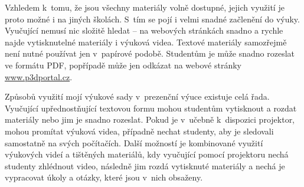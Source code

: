 Vzhledem k~tomu, že jsou všechny materiály volně dostupné, jejich využití je proto možné i na jiných školách.
S~tím se pojí i velmi snadné začlenění do výuky.
Vyučující nemusí nic složitě hledat -- na webových stránkách snadno a rychle najde vytisknutelné materiály i výuková videa.
Textové materiály samozřejmě není nutné používat jen v~papírové podobě. Studentům je může snadno rozeslat ve formátu PDF, popřípadě může jen odkázat na webové stránky \href{https://www.p3dportal.cz}{www.p3dportal.cz}.

Způsobů využití mojí výukové sady v~prezenční výuce existuje celá řada.
Vyučující upřednostňující textovou formu mohou studentům vytisknout a rozdat materiály nebo jim je snadno rozeslat.
Pokud je v~učebně k~dispozici projektor, mohou promítat výuková videa, případně nechat studenty, aby je sledovali samostatně na svých počítačích.
Další možností je kombinované využití výukových videí a tištěných materiálů, kdy vyučující pomocí projektoru nechá studenty zhlédnout video, následně jim rozdá vytisknuté materiály a nechá je vypracovat úkoly a otázky, které jsou v~nich obsaženy.
